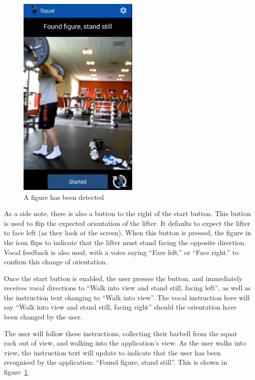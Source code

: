 \begin{figure}[H]
    \centering
	\includegraphics[height=10cm]{application/images/foundfigure}
\caption{A figure has been detected}
\label{fig:foundfigure}
\end{figure}

As a side note, there is also a button to the right of the start button. This button is used to flip the expected orientation of the lifter. It defaults to expect the lifter to face left (as they look at the screen). When this button is pressed, the figure in the icon flips to indicate that the lifter must stand facing the opposite direction. Vocal feedback is also used, with a voice saying ``Face left.'' or ``Face right.'' to confirm this change of orientation.

Once the start button is enabled, the user presses the button, and immediately receives vocal directions to ``Walk into view and stand still, facing left'', as well as the instruction text changing to ``Walk into view''. The vocal instruction here will say ``Walk into view and stand still, facing right'' should the orientation have been changed by the user.

The user will follow these instructions, collecting their barbell from the squat rack out of view, and walking into the application's view. As the user walks into view, the instruction text will update to indicate that the user has been recognised by the application: ``Found figure, stand still''. This is shown in figure~\ref{fig:foundfigure}.


